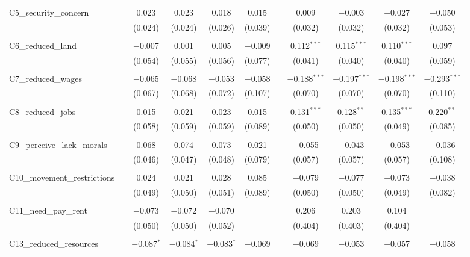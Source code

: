 \begin{table}[H]
\begin{tabular}{@{\extracolsep{4pt}}lcccccccccc}
 C5\_security\_concern &  & 0.023 & 0.023 & 0.018 & 0.015 &  & 0.009 & $-$0.003 & $-$0.027 & $-$0.050 \\ 
  &  & (0.024) & (0.024) & (0.026) & (0.039) &  & (0.032) & (0.032) & (0.032) & (0.053) \\ 
  & & & & & & & & & & \\ 
 C6\_reduced\_land &  & $-$0.007 & 0.001 & 0.005 & $-$0.009 &  & 0.112$^{***}$ & 0.115$^{***}$ & 0.110$^{***}$ & 0.097 \\ 
  &  & (0.054) & (0.055) & (0.056) & (0.077) &  & (0.041) & (0.040) & (0.040) & (0.059) \\ 
  & & & & & & & & & & \\ 
 C7\_reduced\_wages &  & $-$0.065 & $-$0.068 & $-$0.053 & $-$0.058 &  & $-$0.188$^{***}$ & $-$0.197$^{***}$ & $-$0.198$^{***}$ & $-$0.293$^{***}$ \\ 
  &  & (0.067) & (0.068) & (0.072) & (0.107) &  & (0.070) & (0.070) & (0.070) & (0.110) \\ 
  & & & & & & & & & & \\ 
 C8\_reduced\_jobs &  & 0.015 & 0.021 & 0.023 & 0.015 &  & 0.131$^{***}$ & 0.128$^{**}$ & 0.135$^{***}$ & 0.220$^{**}$ \\ 
  &  & (0.058) & (0.059) & (0.059) & (0.089) &  & (0.050) & (0.050) & (0.049) & (0.085) \\ 
  & & & & & & & & & & \\ 
 C9\_perceive\_lack\_morals &  & 0.068 & 0.074 & 0.073 & 0.021 &  & $-$0.055 & $-$0.043 & $-$0.053 & $-$0.036 \\ 
  &  & (0.046) & (0.047) & (0.048) & (0.079) &  & (0.057) & (0.057) & (0.057) & (0.108) \\ 
  & & & & & & & & & & \\ 
 C10\_movement\_restrictions &  & 0.024 & 0.021 & 0.028 & 0.085 &  & $-$0.079 & $-$0.077 & $-$0.073 & $-$0.038 \\ 
  &  & (0.049) & (0.050) & (0.051) & (0.089) &  & (0.050) & (0.050) & (0.049) & (0.082) \\ 
  & & & & & & & & & & \\ 
 C11\_need\_pay\_rent &  & $-$0.073 & $-$0.072 & $-$0.070 &  &  & 0.206 & 0.203 & 0.104 &  \\ 
  &  & (0.050) & (0.050) & (0.052) &  &  & (0.404) & (0.403) & (0.404) &  \\ 
  & & & & & & & & & & \\ 
 C13\_reduced\_resources &  & $-$0.087$^{*}$ & $-$0.084$^{*}$ & $-$0.083$^{*}$ & $-$0.069 &  & $-$0.069 & $-$0.053 & $-$0.057 & $-$0.058 \\ 

\end{tabular}
\end{table}
